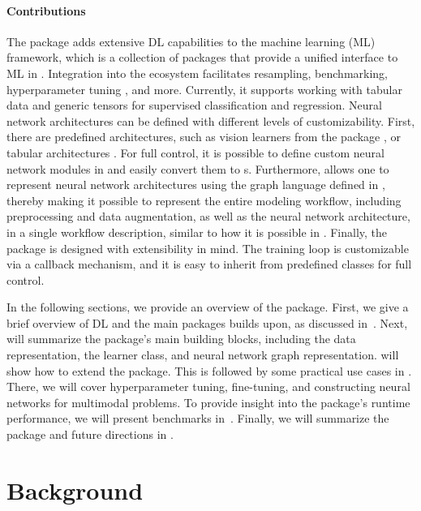 \documentclass[article]{jss}
\theoremstyle{definition}
\begin{document}
\paragraph{Contributions} The  package adds extensive DL capabilities to the \mlrt{} machine learning (ML) framework, which is a collection of \rlang{} packages that provide a unified interface to ML in \rlang{}.
Integration into the \mlrt{} ecosystem facilitates resampling, benchmarking, hyperparameter tuning \citep{ref-mlr3tuning2024}, and more.
Currently, it supports working with tabular data and generic tensors for supervised classification and regression.
Neural network architectures can be defined with different levels of customizability.
First, there are predefined architectures, such as vision learners from the  \rlang{} package \citep{ref-r-torchvision}, or tabular architectures \citep{gorishniy2021revisiting}.
For full control, it is possible to define custom neural network modules in  \torch{} and easily convert them to \mlrt{} s.
Furthermore, \mlrttorch{} allows one to represent neural network architectures using the graph language defined in \mlrtpipelines{}, thereby making it possible to represent the entire modeling workflow, including preprocessing and data augmentation, as well as the neural network architecture, in a single workflow description, similar to how it is possible in \keras{} \citep{ref-chollet2018keras}.
Finally, the package is designed with extensibility in mind. The training loop is customizable via a callback mechanism, and it is easy to inherit from predefined classes for full control.

In the following sections, we provide an overview of the package. First, we give a brief overview of DL and the main \rlang{} packages \mlrttorch{} builds upon, as discussed in~.
Next,  will summarize the package's main building blocks, including the data representation, the learner class, and neural network graph representation.
 will show how to extend the package. This is followed by some practical use cases in .
There, we will cover hyperparameter tuning, fine-tuning, and constructing neural networks for multimodal problems.
To provide insight into the package's runtime performance, we will present benchmarks in~.
Finally, we will summarize the package and future directions in .

\section{Background}\label{sec:background}
\end{document}

